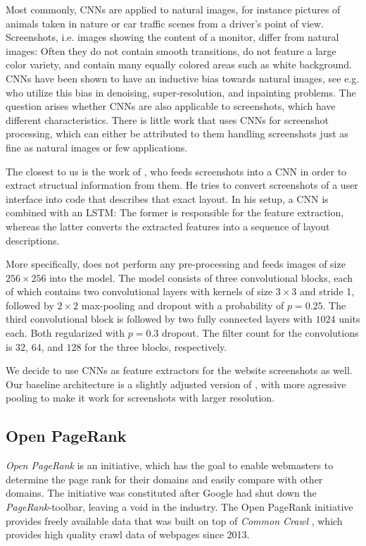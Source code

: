 Most commonly, CNNs are applied to natural images, for instance pictures of animals taken in nature or car traffic scenes from a driver's point of view.
Screenshots, i.e. images showing the content of a monitor, differ from natural images: Often they do not contain smooth transitions, do not feature a large color variety, and contain many equally colored areas such as white background.
CNNs have been shown to have an inductive bias towards natural images, see e.g. \cite{deepimageprior} who utilize this bias in denoising, super-resolution, and inpainting problems.
The question arises whether CNNs are also applicable to screenshots, which have different characteristics. There is little work that uses CNNs for screenshot processing, which can either be attributed to them handling screenshots just as fine as natural images or few applications.

The closest to us is the work of \cite{beltramelli:pix2code}, who feeds screenshots into a CNN in order to extract structual information from them. He tries to convert screenshots of a user interface into code that describes that exact layout. In his setup, a CNN is combined with an LSTM: The former is responsible for the feature extraction, whereas the latter converts the extracted features into a sequence of layout descriptions.

More specifically, \cite{beltramelli:pix2code} does not perform any pre-processing and feeds images of size $256\times 256$ into the model. The model consists of three convolutional blocks, each of which contains two convolutional layers with kernels of size $3\times 3$ and stride 1, followed by $2\times 2$ max-pooling and dropout with a probability of $p=0.25$. The third convolutional block is followed by two fully connected layers with $1024$ units each. Both regularized with $p=0.3$ dropout. The filter count for the convolutions is $32$, $64$, and $128$ for the three blocks, respectively.

We decide to use CNNs as feature extractors for the website screenshots as well. Our baseline architecture is a slightly adjusted version of \cite{beltramelli:pix2code}, with more agressive pooling to make it work for screenshots with larger resolution.

\subsection{Open PageRank}
\label{OpenPageRank}
\textit{Open PageRank} \cite{OpenPageRank} is an initiative, which has the goal to enable webmasters to determine the page rank for their domains and easily compare with other domains. The initiative was constituted after Google had shut down the \textit{PageRank}-toolbar, leaving a void in the industry. The Open PageRank initiative provides freely available data that was built on top of \textit{Common Crawl} \cite{CommonCrawl}, which provides high quality crawl data of webpages since 2013.

